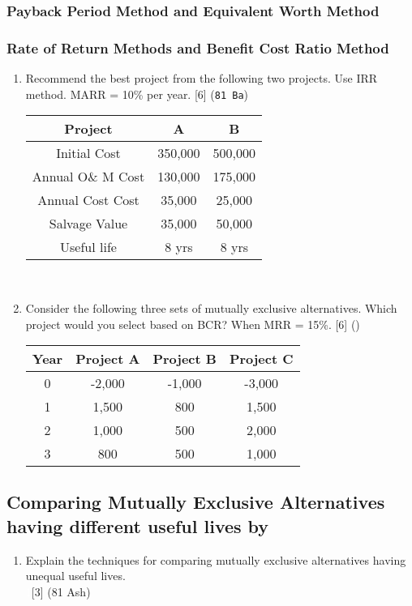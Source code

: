 \documentclass[12pt]{article}
\newcommand{\enter}{\\\textcolor{white}{1}}
\begin{document}
\subsubsection{Payback Period Method and Equivalent Worth Method}
\subsubsection{Rate of Return Methods and Benefit Cost Ratio Method}
\begin{enumerate}[noitemsep, topsep=0pt]
	\item Recommend the best project from the following two projects. Use IRR method. MARR = 10\% per year. \hfill [6] (\texttt{81 Ba})\\
	\begin{tabular}{|c|c|c|}
		\hline
		Project & A & B \\ \hline
		Initial Cost & 350,000 & 500,000 \\ \hline
		Annual O\& M Cost & 130,000 & 175,000 \\ \hline
		Annual Cost Cost & 35,000 & 25,000 \\ \hline
		Salvage Value & 35,000 & 50,000 \\ \hline
		Useful life & 8 yrs & 8 yrs \\ \hline
	\end{tabular}\\
	
	\item Consider the following three sets of mutually exclusive alternatives. Which project would you select based on BCR? When MRR = 15\%. \hfill [6] ()\\
	\begin{tabular}{|c|c|c|c|}
		\hline
		Year & Project A & Project B & Project C \\ \hline
		0 & -2,000 & -1,000 & -3,000 \\ \hline
		1 & 1,500 & 800 & 1,500 \\ \hline
		2 & 1,000 & 500 & 2,000 \\ \hline
		3 & 800 & 500 & 1,000 \\ \hline
	\end{tabular}
\end{enumerate}
\subsection{Comparing Mutually Exclusive Alternatives having different useful lives by}
\begin{enumerate}[noitemsep, topsep = 0pt]
	\item Explain the techniques for comparing mutually exclusive alternatives having unequal useful lives. 
	\enter\hfill [3] (81 Ash)
\end{enumerate}
\end{document}
